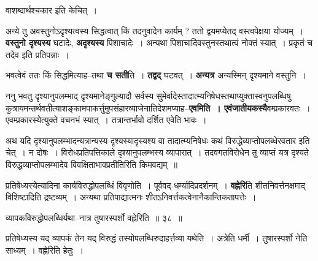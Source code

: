 \documentclass[article,12pt,a4paper]{memoir}
\begin{document}
	  \endgroup
	

	  \pstart वाशब्दार्थश्चकार इति केचित् ।
	\pend
      

	  \pstart अन्ये तु अवस्तुनोऽदृश्यत्वस्य सिद्धत्वात् किं तदनुवादेन कार्यम् ? ततो द्वयमप्येतद् वस्त्वपेक्षया योज्यम् । \textbf{वस्तुनो दृश्यस्य} घटादेः, \textbf{अदृश्यस्य} पिशाचादेः । अन्यथा पिशाचादिवस्तुनस्तथात्वं नोक्तं स्यात् । प्रकृतं च तदेव इति प्रतिपन्नाः ।
	\pend
      

	  \pstart भवत्वेवं ततः किं सिद्धमित्याह--तथा \textbf{च सती}ति । \textbf{तद्वद्} घटवत् । \textbf{अन्य}\leavevmode{}\textbf{त्र} अन्यस्मिन् दृश्यमाने वस्तुनि ।
	\pend
      

	  \pstart ननु भवतु दृश्यानुपलम्भाद् दृश्यमानेङ्गुल्यादौ सर्वस्य सुमेर्वादेस्तादात्म्यनिषेधस्तथाप्युक्तास्वनुपलब्धिषु कुत्रायमन्तर्थवतीत्याशङ्कामपाकर्त्तुमुपसंहारव्याजेनातिदेशमप्याह--\textbf{एवमिति । एवंजातीयकस्यै}वम्प्रकारवतः । एवम्प्रकारस्येत्युक्ते वचनभं  स्यात् । तत्रान्तर्भावो दर्शित एवेति भावः ।
	\pend
      

	  \pstart अथ यदि दृश्यानुपलम्भादन्यत्रान्यस्य दृश्यस्यादृस्यश्य वा तादात्म्यनिषेधः कथं विरुद्धेव्याप्तोपलब्धेरवतार इति चेत् । न दोषः । विरोधप्रतिपत्तिकाले दृश्यानुपलम्भस्य व्यापारात् । तदवगतविरोधेन तु व्याप्तं यत्र दृश्यते विरुद्धव्याप्तोपलम्भादेव विवक्षिताभावप्रतीतिरिति किमवद्यम् ॥
	\pend
      

	  \pstart प्रतिषेध्यस्येत्यादिना कार्यविरुद्धोपलब्धिं विवृणोति । पूर्ववद् धर्म्यादिप्रदर्शनम् । \textbf{वह्नेरि}ति शीतनिवर्त्तनक्षमाद् विशिष्टादिति द्रष्टव्यम् । अन्यथा प्रतिपाद्यात्मनः शीतऽनिवर्त्तकत्वेनानैकान्तिकतापत्तेः ।
	\pend
	  \bigskip
	  \begingroup
	
	  \bigskip
	  \begingroup
	

	  \pstart व्यापकविरुद्धोपलब्धिर्यथा--नात्र तुषारस्पर्शो वह्नेरिति ॥ ३८ ॥
	\pend
      
	  \endgroup
	 

	  \pstart प्रतिषेध्यस्य यद् व्यापकं तेन यद् विरुद्धं तस्योपलब्धिरुदाहर्त्तव्या यथेति । अत्रेति धर्मी । तुषारस्पर्शो नेति साध्यम् । वह्नेरिति हेतुः ।
	\pend
        
\end{document}
